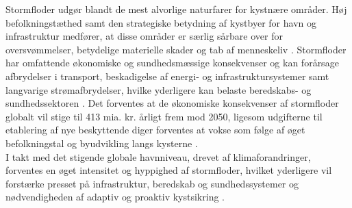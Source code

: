 
Stormfloder udgør blandt de mest alvorlige naturfarer for kystnære områder. Høj befolkningstæthed samt den strategiske betydning af kystbyer for havn og infrastruktur medfører, at disse områder er særlig sårbare over for oversvømmelser, betydelige materielle skader og tab af menneskeliv \citep{kaniewski_solar_2016}. Stormfloder har omfattende økonomiske og sundhedsmæssige konsekvenser og kan forårsage afbrydelser i transport, beskadigelse af energi- og infrastruktursystemer samt langvarige strømafbrydelser, hvilke yderligere kan belaste beredskabs- og sundhedssektoren \citep{lane_health_2013}. Det forventes at de økonomiske konsekvenser af stormfloder globalt vil stige til 413 mia. kr. årligt frem mod 2050, ligesom udgifterne til etablering af nye beskyttende diger forventes at vokse som følge af øget befolkningstal og byudvikling langs kysterne \citep{prahl_damage_2018,hallegatte_future_2013}.\\
I takt med det stigende globale havnniveau, drevet af klimaforandringer, forventes en øget intensitet og hyppighed af stormfloder, hvilket yderligere vil forstærke presset på infrastruktur, beredskab og sundhedssystemer og nødvendigheden af adaptiv og proaktiv kystsikring \citep{marsooli_climate_2019, dedekorkut-howes_when_2020}. \\

